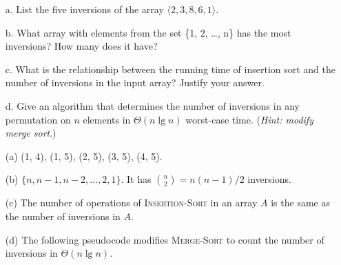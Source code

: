 \begin{enumerate}
{\begin{enumerate}
\item[a.] List the five inversions of the array
$\langle 2, 3, 8, 6, 1 \rangle$.

\item[b.] What array with elements from the set \{1, 2, \dots, n\}
has the most inversions? How many does it have?

\item[c.] What is the relationship between the running time of insertion sort
and the number of inversions in the input array? Justify your answer.

\item[d.] Give an algorithm that determines the number of inversions in any
permutation on $n$ elements in $\Theta(n \lg n)$ worst-case time.
(\emph{Hint: modify merge sort}.)
\end{enumerate}
}

\begin{framed}
\begin{enumerate}
  \item[(a)] (1, 4), (1, 5), (2, 5), (3, 5), (4, 5).
  \item[(b)] $\{n, n - 1, n - 2, \dots, 2, 1\}$.
    It has $\binom{n}{2} = n (n - 1) / 2$ inversions.
  \item[(c)] The number of operations of \textsc{Insertion-Sort} in an array
    $A$ is the same as the number of inversions in $A$.
  \item[(d)] The following pseudocode modifies \textsc{Merge-Sort} to count the
    number of inversions in $\Theta(n \lg n)$.\\
    \begin{algorithm}[H]
    \SetAlgoNoEnd\DontPrintSemicolon%
    \BlankLine
    \end{algorithm}

    \begin{algorithm}[H]
    \SetAlgoNoEnd\DontPrintSemicolon
    \BlankLine
    \end{algorithm}
\end{enumerate}
\end{framed}

\end{enumerate}
